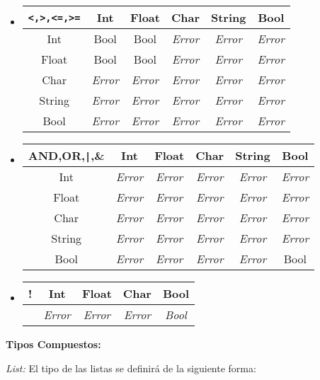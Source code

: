 \documentclass[12pt, spanish]{report}
\begin{document}
\begin{itemize}
\item
\begin{tabular}{|c||ccccc|}
	\hline
\texttt{<,>,<=,>=}&  Int  & Float & Char & String & Bool  \\
	\hline \hline
Int      &  Bool &  Bool & \emph{Error} & \emph{Error} & \emph{Error}\\
Float    &  Bool &  Bool & \emph{Error} & \emph{Error} & \emph{Error}\\
Char     & \emph{Error} & \emph{Error} & \emph{Error} & \emph{Error} & \emph{Error} \\
String   & \emph{Error} & \emph{Error} & \emph{Error} & \emph{Error} & \emph{Error} \\
Bool     & \emph{Error} & \emph{Error} & \emph{Error} & \emph{Error} & \emph{Error} \\
	\hline
\end{tabular}

\item
\begin{tabular}{|c||ccccc|}
	    \hline
AND,OR,\texttt{|},\& &  Int  & Float & Char & String & Bool  \\ 
	    \hline \hline
Int         & \emph{Error} & \emph{Error} & \emph{Error} & \emph{Error} & \emph{Error} \\
Float       & \emph{Error} & \emph{Error} & \emph{Error} & \emph{Error} & \emph{Error} \\
Char        & \emph{Error} & \emph{Error} & \emph{Error} & \emph{Error} & \emph{Error} \\
String      & \emph{Error} & \emph{Error} & \emph{Error} & \emph{Error} & \emph{Error} \\
Bool        & \emph{Error} & \emph{Error} & \emph{Error} & \emph{Error} & Bool \\
	\hline
\end{tabular}

\item
\begin{tabular}{|c||cccc|}
 \hline
!       &  Int  & Float & Char  & Bool  \\ 
 \hline \hline
        & \emph{Error} & \emph{Error} & \emph{Error} & \emph{Bool} \\
	\hline
\end{tabular}
\end{itemize}


\textbf{Tipos Compuestos:}

\emph{List:}
El tipo de las listas se definir\'a de la siguiente forma:
\end{document}
